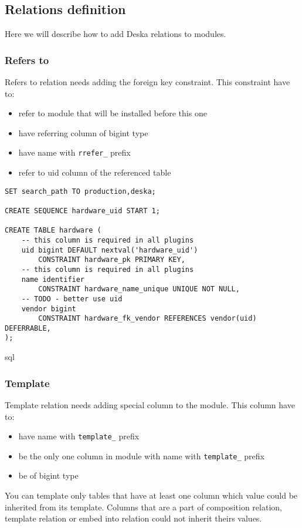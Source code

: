 \documentclass[deska]{subfiles}
\begin{document}
\subsection{Relations definition}
Here we will describe how to add Deska relations to modules.

\subsubsection{Refers to}
Refers to relation needs adding the foreign key constraint. This constraint have to:
\begin{itemize}
    \item refer to module that will be installed before this one
    \item have referring column of bigint type
    \item have name with {\tt rrefer\_} prefix
    \item refer to uid column of the referenced table
\end{itemize}

\begin{verbatim}
SET search_path TO production,deska;

CREATE SEQUENCE hardware_uid START 1;

CREATE TABLE hardware (
    -- this column is required in all plugins
    uid bigint DEFAULT nextval('hardware_uid')
        CONSTRAINT hardware_pk PRIMARY KEY,
    -- this column is required in all plugins
    name identifier
        CONSTRAINT hardware_name_unique UNIQUE NOT NULL,
    -- TODO - better use uid
    vendor bigint 
        CONSTRAINT hardware_fk_vendor REFERENCES vendor(uid) DEFERRABLE,
);
\end{verbatim}{sql}

\subsubsection{Template}
Template relation needs adding special column to the module. This column have to:
\begin{itemize}
    \item have name with {\tt template\_} prefix
    \item be the only one column in module with name with {\tt template\_} prefix
    \item be of bigint type
\end{itemize}
You can template only tables that have at least one column which value could be inherited from its template. Columns that are a part of composition relation, template relation or embed into relation could not inherit theirs values.
\end{document}
